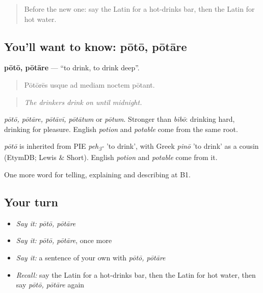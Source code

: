 \label{lesson:LA-C461-poto}



\begin{quote}
Before the new one: say the Latin for a hot-drinks bar, then the Latin for hot water.
\end{quote}

\subsection*{You'll want to know: pōtō, pōtāre}
\textbf{pōtō, pōtāre} — \textquotedblleft{}to drink, to drink deep\textquotedblright{}.

\begin{quote}
Pōtōrēs usque ad mediam noctem pōtant.
\end{quote}

\begin{quote}
\emph{The drinkers drink on until midnight.}
\end{quote}

\emph{pōtō, pōtāre, pōtāvī, pōtātum} or \emph{pōtum}. Stronger than \emph{bibō}: drinking hard, drinking for pleasure. English \emph{potion} and \emph{potable} come from the same root.

\begin{cousinweb}
\emph{pōtō} is inherited from PIE \emph{peh\textsubscript{3}-} 'to drink', with Greek \emph{pinō} 'to drink' as a cousin (EtymDB; Lewis \& Short). English \emph{potion} and \emph{potable} come from it.
\end{cousinweb}

\begin{grammarlens}[title={What you've built}]
One more word for telling, explaining and describing at B1.
\end{grammarlens}

\subsection*{Your turn}
\begin{itemize}
\raggedright
  \item \emph{Say it:} \emph{pōtō, pōtāre}
  \item \emph{Say it:} \emph{pōtō, pōtāre}, once more
  \item \emph{Say it:} a sentence of your own with \emph{pōtō, pōtāre}
  \item \emph{Recall:} say the Latin for a hot-drinks bar, then the Latin for hot water, then say \emph{pōtō, pōtāre} again
\end{itemize}

